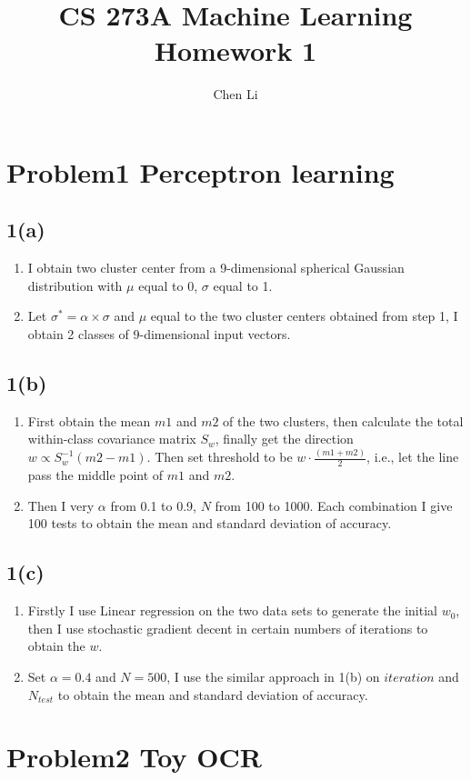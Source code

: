 \documentclass[11pt]{article}
\title{CS 273A Machine Learning Homework 1}
\author{Chen Li}
\begin{document}
\maketitle
\section{Problem1 Perceptron learning} 
\subsection{1(a)}
\begin{enumerate}
\item  I obtain two cluster center from a 9-dimensional spherical Gaussian distribution with $\mu$ equal to 0, $\sigma$ equal to 1. 
\item Let $\sigma^*= \alpha\times\sigma$ and $\mu$ equal to the two cluster centers obtained from step 1, I obtain 2 classes of 9-dimensional input vectors.
\end{enumerate}
\subsection{1(b)}
\begin{enumerate}
\item First obtain the mean $m1$ and $m2$ of the two clusters, then calculate the total within-class covariance matrix $S_{w}$, finally get the direction $w\propto S_{w}^{-1}(m2-m1)$. Then set threshold to be $w\cdot\frac{(m1+m2)}{2}$, i.e., let the line pass the middle point of $m1$ and $m2$.
\item Then I very $\alpha$ from 0.1 to 0.9, $N$ from 100 to 1000. Each combination I give 100 tests to obtain the mean and standard deviation of accuracy.
\end{enumerate}
\subsection{1(c)}
\begin{enumerate}
\item Firstly I use Linear regression on the two data sets to generate the initial $w_0$, then I use stochastic gradient decent in certain numbers of iterations to obtain the $w$.
\item Set $\alpha = 0.4$ and $N=500$, I use the similar approach in 1(b) on $iteration$ and $N_{test}$ to obtain the mean and standard deviation of accuracy.
\end{enumerate}
\section{Problem2 Toy OCR}
\end{document}
